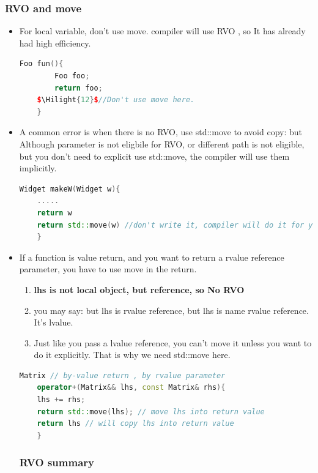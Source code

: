 \documentclass[a4paper,12pt,twoside]{book}
\newcommand{\Hilight}[1]{\makebox[0pt][l]{\color{yellow}\rule[-3pt]{#1em}{11pt}}}
\begin{document}
\subsubsection{RVO and move}
\begin{itemize}
	
	\item For local variable, don't use move. compiler will use RVO , so It has already had high efficiency.
	
	\begin{lstlisting}[frame=single, language=c++]
	Foo fun(){
		Foo foo;
		return foo;
	$\Hilight{12}$//Don't use move here.
	}
	\end{lstlisting}
	
	\item A common error is when there is no RVO, use std::move to avoid copy: but Although parameter is not eligbile for RVO, or different path is not eligible, but you don't need to explicit use std::move, the compiler will use them implicitly.
	
	\begin{lstlisting}[frame=single, language=c++]
	Widget makeW(Widget w){
	.....
	return w
	return std::move(w) //don't write it, compiler will do it for you.
	} 
	\end{lstlisting}
	
	\item If a function is value return, and you want to return a rvalue reference parameter, you have to use move in the return.
	\begin{enumerate}
		\item \textbf{lhs is not local object, but reference, so No RVO}
		\item you may say: but lhs is rvalue reference, but lhs is name rvalue reference. It's lvalue.
		\item Just like you pass a lvalue reference, you can't move it unless you want to do it explicitly. That is why we need std::move here.
	\end{enumerate}
	\begin{lstlisting}[frame=single, language=c++]
	Matrix // by-value return , by rvalue parameter
	operator+(Matrix&& lhs, const Matrix& rhs){
	lhs += rhs;
	return std::move(lhs); // move lhs into return value
	return lhs // will copy lhs into return value 
	} 
	\end{lstlisting}

\subsubsection{RVO summary}


\end{itemize}
\end{document}
